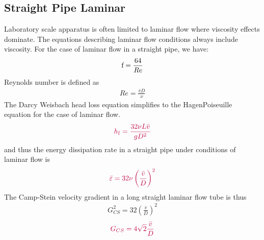 \documentclass[letterpaper,10pt,english]{sphinxmanual}
\begin{document}
\subsection{Straight Pipe Laminar}
\label{\detokenize{Rapid_Mix/RM_Derivations:straight-pipe-laminar}}\label{\detokenize{Rapid_Mix/RM_Derivations:heading-straight-pipe-laminar}}
Laboratory scale apparatus is often limited to laminar flow where viscosity effects dominate. The equations describing laminar flow conditions always include viscosity. For the case of laminar flow in a straight pipe, we have:
\begin{equation}\label{equation:Rapid_Mix/RM_Derivations:Rapid_Mix/RM_Derivations:27}
\begin{split}{\rm f} = \frac{64}{Re}\end{split}
\end{equation}
Reynolds number is defined as
\begin{equation}\label{equation:Rapid_Mix/RM_Derivations:Rapid_Mix/RM_Derivations:28}
\begin{split}Re= \frac{\bar vD}{\nu}\end{split}
\end{equation}
The Darcy Weisbach head loss equation simplifies to the Hagen\textendash{}Poiseuille equation for the case of laminar flow.
\begin{equation}\label{equation:Rapid_Mix/RM_Derivations:Rapid_Mix/RM_Derivations:29}
\begin{split}\color{purple}{
  h_{{\rm f}} = \frac{32\nu L\bar v}{gD^2}
  }\end{split}
\end{equation}
and thus the energy dissipation rate in a straight pipe under conditions of laminar flow is
\begin{equation}\label{equation:Rapid_Mix/RM_Derivations:Rapid_Mix/RM_Derivations:30}
\begin{split}\color{purple}{
  \bar\varepsilon =32\nu \left( \frac{\bar v}{D} \right)^2
}\end{split}
\end{equation}
The Camp-Stein velocity gradient in a long straight laminar flow tube is thus
\begin{equation}\label{equation:Rapid_Mix/RM_Derivations:Rapid_Mix/RM_Derivations:31}
\begin{split}G_{CS}^2 =32 \left( \frac{\bar v}{D} \right)^2\end{split}
\end{equation}\begin{equation}\label{equation:Rapid_Mix/RM_Derivations:Rapid_Mix/RM_Derivations:32}
\begin{split}\color{purple}{
  G_{CS} =4\sqrt2 \frac{\bar v}{D}
}\end{split}
\end{equation}
\end{document}
